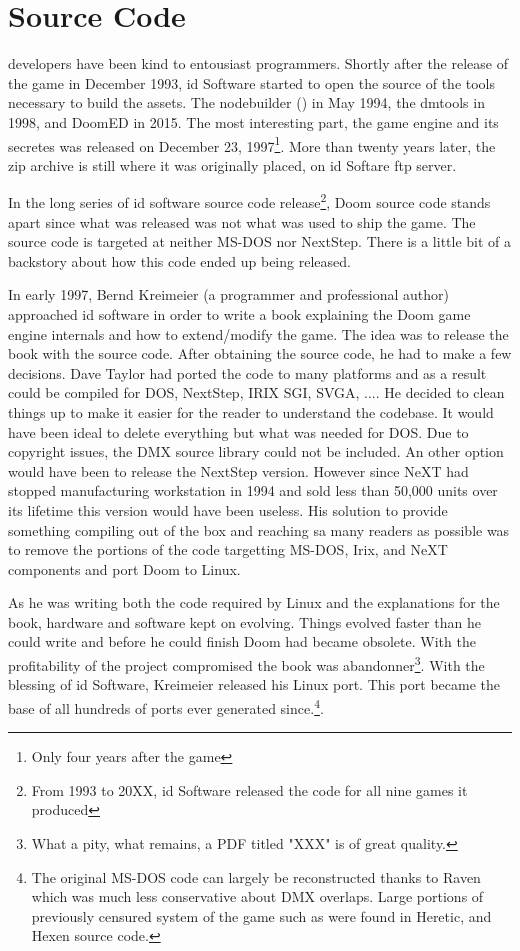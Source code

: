\section{Source Code}
\doom developers have been kind to entousiast programmers. Shortly after the release of the game in December 1993, id Software started to open the source of the tools necessary to build the assets. The nodebuilder () in May 1994, the dmtools in 1998, and DoomED in 2015. The most interesting part, the game engine and its secretes was released on December 23, 1997\footnote{Only four years after the game}. More than twenty years later, the zip archive is still where it was originally placed, on id Softare ftp server.\\
\par
{}
\par
 In the long series of id software source code release\footnote{From 1993 to 20XX, id Software released the code for all nine games it produced}, Doom source code stands apart since what was released was not what was used to ship the game. The source code is targeted at neither MS-DOS nor NextStep. There is a little bit of a backstory about how this code ended up being released.\\
 \par
 In early 1997, Bernd Kreimeier (a programmer and professional author) approached id software in order to write a book explaining the Doom game engine internals and how to extend/modify the game. The idea was to release the book with the source code. After obtaining the source code, he had to make a few decisions. Dave Taylor had ported the code to many platforms and as a result \doom could be compiled for DOS, NextStep, IRIX SGI, SVGA, .... He decided to clean things up to make it easier for the reader to understand the codebase. It would have been ideal to delete everything but what was needed for DOS. Due to copyright issues, the DMX source library could not be included. An other option would have been to release the NextStep version. However since NeXT had stopped manufacturing workstation in 1994 and sold less than 50,000 units over its lifetime this version would have been useless. His solution to provide something compiling out of the box and reaching sa many readers as possible was to remove the portions of the code targetting MS-DOS, Irix, and NeXT components and port Doom to Linux.\\
\par
 As he was writing both the code required by Linux and the explanations for the book, hardware and software kept on evolving. Things evolved faster than he could write and before he could finish Doom had became obsolete. With the profitability of the project compromised the book was abandonner\footnote{What a pity, what remains, a PDF titled "XXX" is of great quality.}. With the blessing of id Software, Kreimeier released his Linux port. This port became the base of all hundreds of ports ever generated since.\footnote{The original MS-DOS code can largely be reconstructed thanks to Raven which was much less conservative about DMX overlaps. Large portions of previously censured system of the game such as  were found in Heretic, and Hexen source code.}.\\
 \par  


